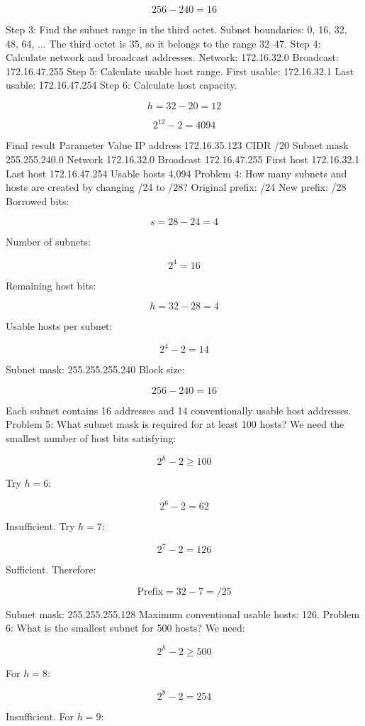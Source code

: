 \[
256-240=16
\]

Step 3: Find the subnet range in the third octet.
Subnet boundaries:
0, 16, 32, 48, 64, ...
The third octet is 35, so it belongs to the range 32--47.
Step 4: Calculate network and broadcast addresses.
Network:
172.16.32.0
Broadcast:
172.16.47.255
Step 5: Calculate usable host range.
First usable:
172.16.32.1
Last usable:
172.16.47.254
Step 6: Calculate host capacity.

\[
h=32-20=12
\]


\[
2^{12}-2=4094
\]

Final result
Parameter
Value
IP address
172.16.35.123
CIDR
/20
Subnet mask
255.255.240.0
Network
172.16.32.0
Broadcast
172.16.47.255
First host
172.16.32.1
Last host
172.16.47.254
Usable hosts
4,094
Problem 4: How many subnets and hosts are created by changing /24 to /28?
Original prefix: /24
New prefix: /28
Borrowed bits:

\[
s=28-24=4
\]

Number of subnets:

\[
2^4=\boxed{16}
\]

Remaining host bits:

\[
h=32-28=4
\]

Usable hosts per subnet:

\[
2^4-2=\boxed{14}
\]

Subnet mask:
255.255.255.240
Block size:

\[
256-240=16
\]

Each subnet contains 16 addresses and 14 conventionally usable host addresses.
Problem 5: What subnet mask is required for at least 100 hosts?
We need the smallest number of host bits satisfying:

\[
2^h-2\geq100
\]

Try $h=6$:

\[
2^6-2=62
\]

Insufficient.
Try $h=7$:

\[
2^7-2=126
\]

Sufficient.
Therefore:

\[
\text{Prefix}=32-7=\boxed{/25}
\]

Subnet mask:
255.255.255.128
Maximum conventional usable hosts: 126.
Problem 6: What is the smallest subnet for 500 hosts?
We need:

\[
2^h-2\geq500
\]

For $h=8$:

\[
2^8-2=254
\]

Insufficient.
For $h=9$:

